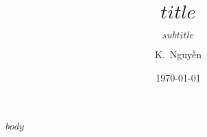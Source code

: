 \documentclass[
$if(handout)$
handout,
$endif$
]{beamer}
\date{\today}
\author{K.~Nguyễn}
\institute{King's College, The British School of Madrid}
\title{$title$}
\subtitle{$subtitle$}
\begin{document}
\maketitle

$body$
\end{document}
